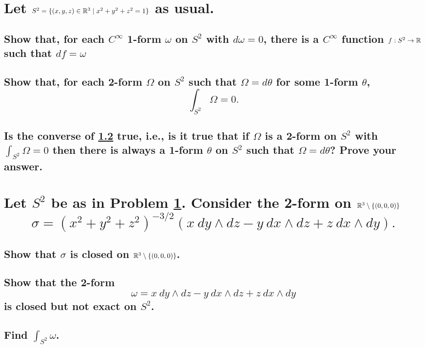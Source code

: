 \documentclass[10pt]{article}
\begin{document}
\section{Let $S^2 = \{ (x,y,z) \in \mathbb{R}^3 \mid x^2 + y^2 +z^2 =1 \}$ as usual.}
\label{four}

\subsection{Show that, for each $C^\infty$ 1-form $\omega$ on $S^2$ with $d \omega =0$, there is a
  $C^\infty$ function $f : S^2 \to \mathbb{R} $ such that $df = \omega$}

\subsection{Show that, for each 2-form $\Omega$ on $S^2$ such that $\Omega = d \theta$ for some
  1-form $\theta$, $$\int_{S^2} \Omega =0.$$}
\label{drh}


\subsection{Is the converse of \ref{drh} true, i.e., is it true that if $\Omega$ is a 2-form on
  $S^2$ with $\int_{S^2} \Omega =0$ then there is always a 1-form $\theta$ on $S^2$ such that
  $\Omega = d \theta$? Prove your answer.}

\section{Let $S^2$ be as in Problem \ref{four}. Consider the 2-form on $\mathbb{R}^3 \setminus
  \{(0,0,0)\}$ $$\sigma = (x^2 + y^2 + z^2)^{-3/2} (x\ dy \wedge dz - y\ dx \wedge dz + z\ dx \wedge
  dy).$$}

\subsection{Show that $\sigma$ is closed on $\mathbb{R}^3 \setminus \{(0,0,0)\}$.}

\subsection{Show that the 2-form
$$\omega =  x\ dy \wedge dz - y\ dx \wedge dz + z\ dx \wedge dy$$
is closed but not exact on $S^2$.}

\subsection{Find $\int_{S^2} \omega$.}
\end{document}
